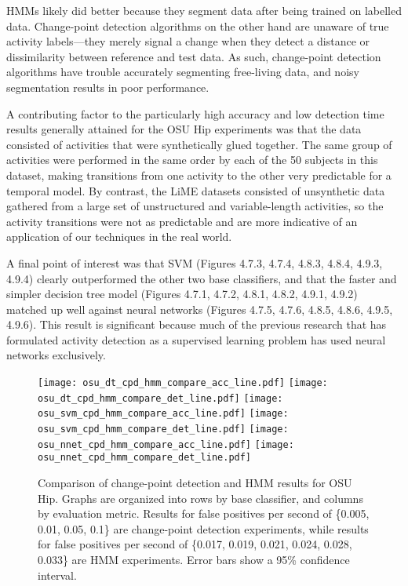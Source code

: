 HMMs likely did better because they segment data after being trained on labelled
data. Change-point detection algorithms on the other hand are unaware of true
activity labels---they merely signal a change when they detect a distance or
dissimilarity between reference and test data. As such, change-point detection
algorithms have trouble accurately segmenting free-living data, and noisy
segmentation results in poor performance.

A contributing factor to the particularly high accuracy and low detection time
results generally attained for the OSU Hip experiments was that the data
consisted of activities that were synthetically glued together. The same group
of activities were performed in the same order by each of the 50 subjects in
this dataset, making transitions from one activity to the other very predictable
for a temporal model. By contrast, the LiME datasets consisted of unsynthetic
data gathered from a large set of unstructured and variable-length activities,
so the activity transitions were not as predictable and are more indicative of
an application of our techniques in the real world.


A final point of interest was that SVM (Figures 4.7.3, 4.7.4, 4.8.3, 4.8.4, 4.9.3, 4.9.4) clearly outperformed the other two
base classifiers, and that the faster and simpler decision tree model (Figures 4.7.1, 4.7.2, 4.8.1, 4.8.2, 4.9.1, 4.9.2) matched up
well against neural networks (Figures 4.7.5, 4.7.6, 4.8.5, 4.8.6, 4.9.5, 4.9.6). This result is significant because much of the
previous research that has formulated activity detection as a supervised learning
problem has used neural networks exclusively.

\begin{figure}[h]
 \centering
 \texttt{[image: osu\_dt\_cpd\_hmm\_compare\_acc\_line.pdf]} \hspace{1em}\vspace{1em}
 \texttt{[image: osu\_dt\_cpd\_hmm\_compare\_det\_line.pdf]} 
 \texttt{[image: osu\_svm\_cpd\_hmm\_compare\_acc\_line.pdf]} \hspace{1em}\vspace{1em}
 \texttt{[image: osu\_svm\_cpd\_hmm\_compare\_det\_line.pdf]}
 \texttt{[image: osu\_nnet\_cpd\_hmm\_compare\_acc\_line.pdf]} \hspace{1em}
 \texttt{[image: osu\_nnet\_cpd\_hmm\_compare\_det\_line.pdf]}
 \caption{Comparison of change-point detection and HMM results for OSU Hip.
  Graphs are organized into rows by base classifier, and columns by evaluation
  metric. Results for false positives per second of \{0.005, 0.01, 0.05, 0.1\} are change-point
  detection experiments, while results for false positives per second of
  \{0.017, 0.019, 0.021, 0.024, 0.028, 0.033\} are HMM experiments. Error bars
  show a 95\% confidence interval.}
 \label{fig:osu_compare_cpd_hmm}
\end{figure}


